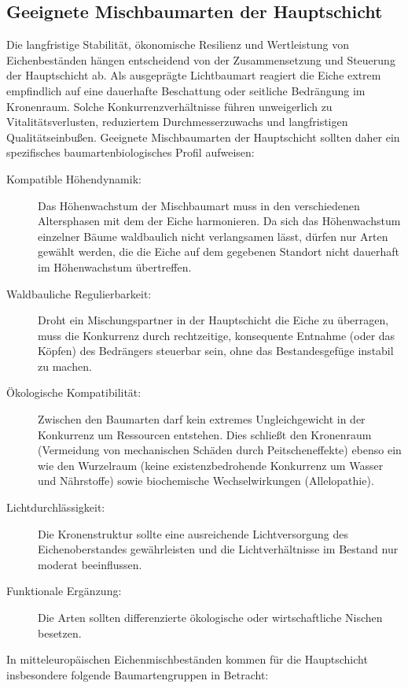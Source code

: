 \documentclass[twocolumn, bibliography=totoc, abstract=true]{scrartcl}
\begin{document}
\subsection{Geeignete Mischbaumarten der Hauptschicht}

Die langfristige Stabilität, ökonomische Resilienz und Wertleistung von Eichenbeständen hängen entscheidend von der Zusammensetzung und Steuerung der Hauptschicht ab. Als ausgeprägte Lichtbaumart reagiert die Eiche extrem empfindlich auf eine dauerhafte Beschattung oder seitliche Bedrängung im Kronenraum. Solche Konkurrenzverhältnisse führen unweigerlich zu Vitalitätsverlusten, reduziertem Durchmesserzuwachs und langfristigen Qualitätseinbußen. Geeignete Mischbaumarten der Hauptschicht sollten daher ein spezifisches baumartenbiologisches Profil aufweisen:

\begin{description}
\item[Kompatible Höhendynamik:] Das Höhenwachstum der Mischbaumart muss in den verschiedenen Altersphasen mit dem der Eiche harmonieren. Da sich das Höhenwachstum einzelner Bäume waldbaulich nicht verlangsamen lässt, dürfen nur Arten gewählt werden, die die Eiche auf dem gegebenen Standort nicht dauerhaft im Höhenwachstum übertreffen.
\item[Waldbauliche Regulierbarkeit:] Droht ein Mischungspartner in der Hauptschicht die Eiche zu überragen, muss die Konkurrenz durch rechtzeitige, konsequente Entnahme (oder das Köpfen) des Bedrängers steuerbar sein, ohne das Bestandesgefüge instabil zu machen.
\item[Ökologische Kompatibilität:] Zwischen den Baumarten darf kein extremes Ungleichgewicht in der Konkurrenz um Ressourcen entstehen. Dies schließt den Kronenraum (Vermeidung von mechanischen Schäden durch Peitscheneffekte) ebenso ein wie den Wurzelraum (keine existenzbedrohende Konkurrenz um Wasser und Nährstoffe) sowie biochemische Wechselwirkungen (Allelopathie).
\item[Lichtdurchlässigkeit:] Die Kronenstruktur sollte eine ausreichende Lichtversorgung des Eichenoberstandes gewährleisten und die Lichtverhältnisse im Bestand nur moderat beeinflussen.
\item[Funktionale Ergänzung:] Die Arten sollten differenzierte ökologische oder wirtschaftliche Nischen besetzen.
\end{description}

In mitteleuropäischen Eichenmischbeständen kommen für die Hauptschicht insbesondere folgende Baumartengruppen in Betracht:
\end{document}
